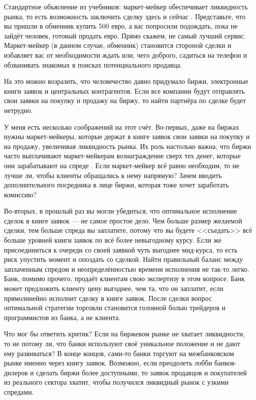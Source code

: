Стандартное объяснение из учебников: маркет-мейкер обеспечивает ликвидность
рынка, то есть возможность заключить сделку здесь и сейчас \cite[p.
159,223]{hull2015options}. Представьте, что вы пришли в обменник купить
\num{500} евро, а вас попросили подождать, пока не зайдёт человек, готовый
продать евро. Прямо скажем, не самый лучший сервис. Маркет-мейкер (в данном
случае, обменник) становится стороной сделки и избавляет вас от необходимости
ждать или, чего доброго, садиться на телефон и обзванивать знакомых в поисках
потенциального продавца.

На это можно возразить, что человечество давно придумало биржи, электронные
книги заявок и центральных контрагентов. Если все компании будут отправлять свои
заявки на покупку и продажу на биржу, то найти партнёра по сделке будет
нетрудно.

У меня есть несколько соображений на этот счёт. Во-первых, даже на биржах нужны
маркет-мейкеры, которые держат в книге заявок свои заявки на покупку и на
продажу, увеличивая ликвидность рынка. Их роль настолько важна, что биржи часто
выплачивают маркет-мейкерам вознаграждение сверх тех денег, которые они
зарабатывают на спреде \cite{moex2018mm}\cite[ch. 7]{hasbrouck2017securities}.
Если маркет-мейкер всё равно необходим, то не лучше ли, чтобы клиенты обращались
к нему напрямую? Зачем вводить дополнительного посредника в лице биржи, которая
тоже хочет заработать комиссию?

Во-вторых, в прошлый раз вы могли убедиться, что оптимальное исполнение сделок в
книге заявок --- не самое простое дело. Чем больше размер желаемой сделки, тем
больше спреда вы заплатите, потому что вы будете <<съедать>> всё больше уровней
книги заявок по всё более невыгодному курсу. Если же присоединиться к очереди со
своей заявкой чуть выгоднее мид-курса, то есть риск упустить момент и опоздать
со сделкой. Найти правильный баланс между заплаченным спредом и
неопределённостью времени исполнения не так-то легко. Банк, помимо прочего,
продаёт клиентам свою экспертизу в этом вопросе. Банк может предложить клиенту
цену выгоднее, чем та, что он заплатит, если прямолинейно исполнит сделку в
книге заявок. После сделки вопрос оптимальной стратегии торговли становится
головной болью трейдеров и программистов из банка, а не клиента.

Что мог бы ответить критик? Если на биржевом рынке не хватает ликвидности, то не
потому ли, что банки используют своё уникальное положение и не дают ему
развиваться? В конце концов, сами-то банки торгуют на межбанковском рынке именно
через книгу заявок. Возможно, если преодолеть лобби банков-дилеров и сделать
биржи более доступными, то заявок продавцов и покупателей из реального сектора
хватит, чтобы получился ликвидный рынок с узкими спредами.


